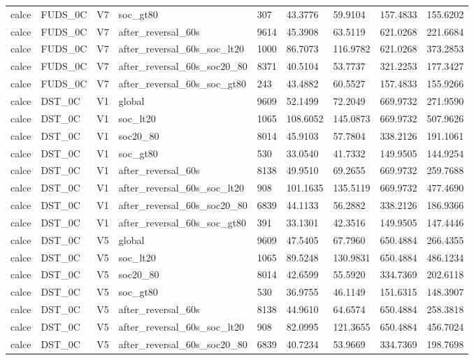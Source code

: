 \begin{tabular}{lllllllll}
calce & FUDS\_0C & V7 & soc\_gt80 & 307 & 43.3776 & 59.9104 & 157.4833 & 155.6202 \\
calce & FUDS\_0C & V7 & after\_reversal\_60s & 9614 & 45.3908 & 63.5119 & 621.0268 & 221.6684 \\
calce & FUDS\_0C & V7 & after\_reversal\_60s\_soc\_lt20 & 1000 & 86.7073 & 116.9782 & 621.0268 & 373.2853 \\
calce & FUDS\_0C & V7 & after\_reversal\_60s\_soc20\_80 & 8371 & 40.5104 & 53.7737 & 321.2253 & 177.3427 \\
calce & FUDS\_0C & V7 & after\_reversal\_60s\_soc\_gt80 & 243 & 43.4882 & 60.5527 & 157.4833 & 155.9266 \\
calce & DST\_0C & V1 & global & 9609 & 52.1499 & 72.2049 & 669.9732 & 271.9590 \\
calce & DST\_0C & V1 & soc\_lt20 & 1065 & 108.6052 & 145.0873 & 669.9732 & 507.9626 \\
calce & DST\_0C & V1 & soc20\_80 & 8014 & 45.9103 & 57.7804 & 338.2126 & 191.1061 \\
calce & DST\_0C & V1 & soc\_gt80 & 530 & 33.0540 & 41.7332 & 149.9505 & 144.9254 \\
calce & DST\_0C & V1 & after\_reversal\_60s & 8138 & 49.9510 & 69.2655 & 669.9732 & 259.7688 \\
calce & DST\_0C & V1 & after\_reversal\_60s\_soc\_lt20 & 908 & 101.1635 & 135.5119 & 669.9732 & 477.4690 \\
calce & DST\_0C & V1 & after\_reversal\_60s\_soc20\_80 & 6839 & 44.1133 & 56.2882 & 338.2126 & 186.9366 \\
calce & DST\_0C & V1 & after\_reversal\_60s\_soc\_gt80 & 391 & 33.1301 & 42.3516 & 149.9505 & 147.4446 \\
calce & DST\_0C & V5 & global & 9609 & 47.5405 & 67.7960 & 650.4884 & 266.4355 \\
calce & DST\_0C & V5 & soc\_lt20 & 1065 & 89.5248 & 130.9831 & 650.4884 & 486.1234 \\
calce & DST\_0C & V5 & soc20\_80 & 8014 & 42.6599 & 55.5920 & 334.7369 & 202.6118 \\
calce & DST\_0C & V5 & soc\_gt80 & 530 & 36.9755 & 46.1149 & 151.6315 & 148.3907 \\
calce & DST\_0C & V5 & after\_reversal\_60s & 8138 & 44.9610 & 64.6574 & 650.4884 & 258.3818 \\
calce & DST\_0C & V5 & after\_reversal\_60s\_soc\_lt20 & 908 & 82.0995 & 121.3655 & 650.4884 & 456.7024 \\
calce & DST\_0C & V5 & after\_reversal\_60s\_soc20\_80 & 6839 & 40.7234 & 53.9669 & 334.7369 & 198.7698 \\

\end{tabular}
